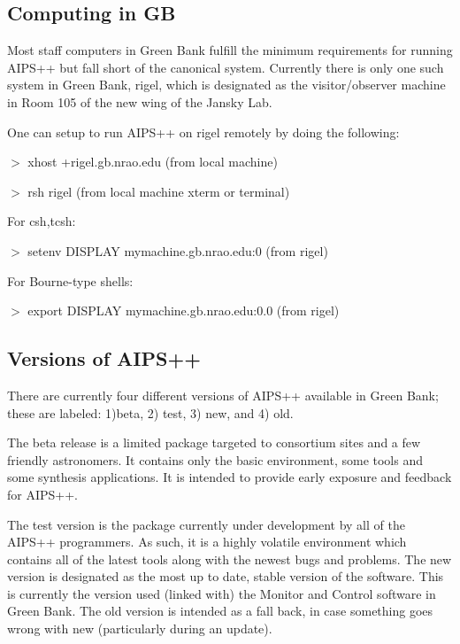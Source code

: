 \bigskip
\subsection{Computing in GB}

Most staff computers in Green Bank fulfill the minimum requirements for 
running AIPS++ but fall short of the canonical system. Currently there
is only one such system in Green Bank, rigel, which is designated as the
visitor/observer machine in Room 105 of the new wing of the Jansky Lab.

One can setup to run AIPS++ on rigel remotely by doing the following:

\begin{description}
\item{$>$} xhost +rigel.gb.nrao.edu (from local machine)
\item{$>$} rsh rigel (from local machine xterm or terminal)

For csh,tcsh:

\item{$>$} setenv DISPLAY mymachine.gb.nrao.edu:0 (from rigel)

For Bourne-type shells:

\item{$>$} export DISPLAY mymachine.gb.nrao.edu:0.0 (from rigel)
\end{description}


\bigskip
\subsection{Versions of AIPS++}

There are currently four different versions of AIPS++ available in
Green Bank; these are labeled: 
1)beta, 2) test, 3) new, and 4) old.

The beta release is a limited package targeted to consortium sites and a
few friendly astronomers. It contains only the basic environment, some
tools and some synthesis applications. It is intended to provide early
exposure and feedback for AIPS++. 

The test version is the package currently under development by all of the AIPS++
programmers. As such, it is a highly volatile environment which contains
all of the latest tools along with the newest bugs and problems.
The new version is designated as the most up to date, stable version of the
software. This is currently the version used (linked with) the Monitor and
Control software in Green Bank.
The old version is intended as a fall back, in case something goes wrong
with new (particularly during an update).

